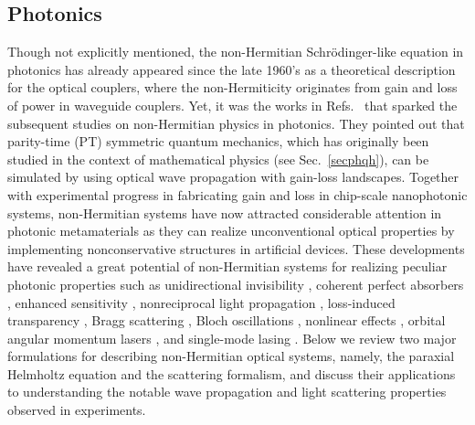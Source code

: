 \documentclass{tADP2e}
\theoremstyle{plain}
\theoremstyle{plain}
\theoremstyle{definition}
\begin{document}
\subsection{Photonics\label{secphoto}}
Though not explicitly mentioned, the non-Hermitian Schr{\"o}dinger-like equation in photonics has already appeared since  the late 1960's \cite{EAJM69,GE72,YC92,Malomed:96} as a theoretical description for the optical couplers, where the non-Hermiticity originates from  gain and loss of power in waveguide couplers. Yet, it was the works in Refs.~\cite{AR05,REG07,KGM08,MZH08} that sparked the subsequent studies on non-Hermitian physics in photonics. They  pointed out that parity-time (PT) symmetric quantum mechanics, which has  originally been studied in the context of mathematical physics (see Sec.~\ref{secphqh}), can be simulated by using optical wave propagation with gain-loss landscapes. Together with experimental progress in fabricating gain and loss in chip-scale nanophotonic systems, non-Hermitian systems have now attracted considerable attention in photonic metamaterials as they can realize unconventional optical properties by implementing nonconservative structures in artificial devices.   These developments have revealed a great potential of non-Hermitian systems for realizing peculiar photonic properties such as unidirectional invisibility \cite{LZ11,YX13,LF13}, coherent perfect absorbers \cite{LS102,CYD11,SY14}, enhanced sensitivity \cite{LZP16,CPY16,HH17,CPY18}, nonreciprocal light propagation \cite{RH10,BP14,CL14}, loss-induced transparency \cite{GA09}, Bragg scattering \cite{Berry_2008,LSS10,MMA12}, Bloch oscillations \cite{LS09,WM15}, nonlinear effects \cite{SAA10,RD11}, orbital angular momentum lasers \cite{MP16}, and  single-mode lasing \cite{PB14,BM14}. Below we review two major formulations for describing non-Hermitian optical systems, namely, the paraxial Helmholtz equation and the scattering formalism, and discuss their applications to understanding the notable wave propagation and light scattering properties observed in experiments.  
\end{document}
